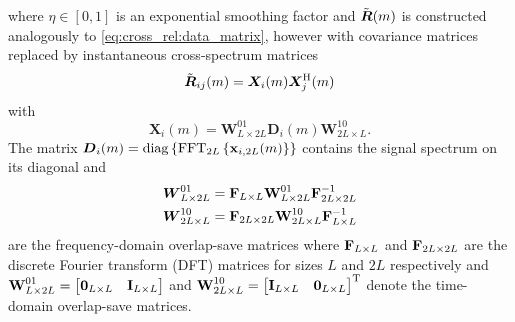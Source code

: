 \documentclass{article}
\begin{document}
where \(\eta \in [0,1]\) is an exponential smoothing factor and \(\tilde{{\bm{{R}}}}(m)\) is constructed analogously to \eqref{eq:cross_rel:data_matrix}, however with covariance matrices replaced by instantaneous cross-spectrum matrices 
\begin{equation}
    \tilde{{\bm{{R}}}}_{ij}(m) = \bm{X}_{i} (m) \bm{X}_{j}^{\mathrm{H}} (m)
\end{equation}
with 
\begin{equation}
    \bm{X}_{i}(m) = \bm{{W}}^{01}_{L \times 2L} \bm{{D}}_{i}(m) \bm{{W}}^{10}_{2L \times L}.
\end{equation}
The matrix \(\bm{{D}}_{i}(m) = \operatorname{diag} \left\{ \operatorname{FFT}_{2L} \left\{ \bm{\mathrm{x}}_{i,2L}(m) \right\} \right\}\) contains the  signal spectrum on its diagonal and
\begin{align}
    \bm{{W}}_{L \times 2L}^{01} &= \bm{\mathrm{F}}_{L \times L} \bm{\mathrm{W}}_{L \times 2L}^{01} \bm{\mathrm{F}}_{2L \times 2L}^{-1}\\
    \bm{{W}}_{2L \times L}^{10} &= \bm{\mathrm{F}}_{2L \times 2L} \bm{\mathrm{W}}_{2L \times L}^{10} \bm{\mathrm{F}}_{L \times L}^{-1}\label{eq:frequency_domain:overlap}
\end{align} are the frequency-domain overlap-save matrices where \(\bm{\mathrm{F}}_{L \times L}\) and \(\bm{\mathrm{F}}_{2L \times 2L}\) are the discrete Fourier transform (DFT) matrices for sizes \(L\) and \(2L\) respectively and \(
    \bm{\mathrm{W}}_{L \times 2L}^{01} = \begin{bmatrix}
        \bm{\mathrm{0}}_{L \times L} & \bm{\mathrm{I}}_{L \times L}
    \end{bmatrix}\)
    and \(
    \bm{\mathrm{W}}_{2L \times L}^{10} = \begin{bmatrix}
        \bm{\mathrm{I}}_{L \times L} & \bm{\mathrm{0}}_{L \times L}
    \end{bmatrix}^{\mathrm{T}}\)
denote the time-domain overlap-save matrices.
\end{document}
